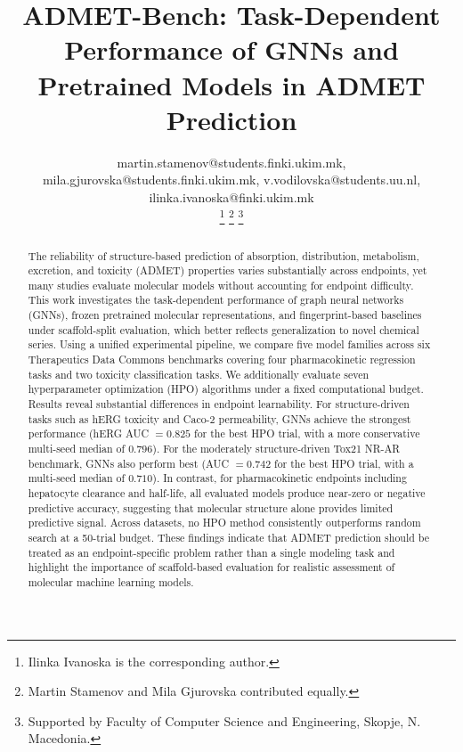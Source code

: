 \documentclass[journal]{IEEEtran}
\begin{document}
\title{ADMET-Bench: Task-Dependent Performance of GNNs and Pretrained Models in ADMET Prediction}

\author{



martin.stamenov@students.finki.ukim.mk, mila.gjurovska@students.finki.ukim.mk, v.vodilovska@students.uu.nl, ilinka.ivanoska@finki.ukim.mk

\thanks{Ilinka Ivanoska is the corresponding author.}
\thanks{Martin Stamenov and Mila Gjurovska contributed equally.}
\thanks{Supported by Faculty of Computer Science and Engineering, Skopje, N. Macedonia.}
}

\maketitle

\begin{abstract}
The reliability of structure-based prediction of absorption, distribution, metabolism, excretion, and toxicity (ADMET) properties varies substantially across endpoints, yet many studies evaluate molecular models without accounting for endpoint difficulty. This work investigates the task-dependent performance of graph neural networks (GNNs), frozen pretrained molecular representations, and fingerprint-based baselines under scaffold-split evaluation, which better reflects generalization to novel chemical series. Using a unified experimental pipeline, we compare five model families across six Therapeutics Data Commons benchmarks covering four pharmacokinetic regression tasks and two toxicity classification tasks. We additionally evaluate seven hyperparameter optimization (HPO) algorithms under a fixed computational budget. Results reveal substantial differences in endpoint learnability. For structure-driven tasks such as hERG toxicity and Caco-2 permeability, GNNs achieve the strongest performance (hERG AUC $=0.825$ for the best HPO trial, with a more conservative multi-seed median of $0.796$). For the moderately structure-driven Tox21 NR-AR benchmark, GNNs also perform best (AUC $=0.742$ for the best HPO trial, with a multi-seed median of $0.710$). In contrast, for pharmacokinetic endpoints including hepatocyte clearance and half-life, all evaluated models produce near-zero or negative predictive accuracy, suggesting that molecular structure alone provides limited predictive signal. Across datasets, no HPO method consistently outperforms random search at a 50-trial budget. These findings indicate that ADMET prediction should be treated as an endpoint-specific problem rather than a single modeling task and highlight the importance of scaffold-based evaluation for realistic assessment of molecular machine learning models.
\end{abstract}
\end{document}
